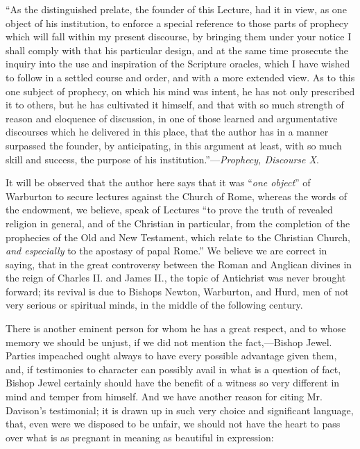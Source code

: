 ``As
the distinguished prelate, the founder of this Lecture, had it in
view, as one object of his institution, to enforce a special reference
to those parts of prophecy which will fall within my present
discourse, by bringing them under your notice I shall comply with that
his particular design, and at the same time prosecute the inquiry into
the use and inspiration of the Scripture oracles, which I have wished
to follow in a settled course and order, and with a more extended
view. As to this one subject of prophecy, on which his mind was
intent, he has not only prescribed it to others, but he has cultivated
it himself, and that with so much strength of reason and eloquence of
discussion, in one of those learned and argumentative discourses which
he delivered in this place, that the author has in a manner surpassed
the founder, by anticipating, in this argument at least, with so much
skill and success, the purpose of his institution.''—\emph{Prophecy,
Discourse X}.

It will be observed that the author here says
that it was ``\emph{one object}'' of Warburton to secure lectures
against the Church of Rome, whereas the words of the endowment,
we believe, speak of Lectures ``to prove the truth of revealed religion
in general, and of the Christian in particular, from the completion of
the prophecies of the Old and New Testament, which relate to the
Christian Church, \emph{and especially} to the apostasy of papal Rome.''
We believe we are correct in saying, that in the great controversy
between the Roman and Anglican divines in the reign of Charles II. and
James II., the topic of Antichrist was never brought forward; its
revival is due to Bishops Newton, Warburton, and Hurd, men of not very
serious or spiritual minds, in the middle of the following century.

There is another eminent person for whom he has a
great respect, and to whose memory we should be unjust, if we did not
mention the fact,—Bishop Jewel. Parties impeached ought always to
have every possible advantage given them, and, if testimonies to
character can possibly avail in what is a question of fact, Bishop
Jewel certainly should have the benefit of a witness so very different
in mind and temper from himself. And we have another reason for citing
Mr. Davison's testimonial; it is drawn up in such very choice and
significant language, that, even were we disposed to be unfair, we
should not have the heart to pass over what is as pregnant in meaning
as beautiful in expression:

